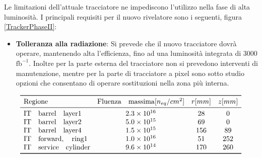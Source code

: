 Le limitazioni dell'attuale tracciatore ne impediscono l'utilizzo nella fase di alta luminosità. I principali requisiti per il nuovo rivelatore sono i seguenti, figura \ref{TrackerPhaseII}:

\begin{itemize}
\item \textbf{Tolleranza alla radiazione}: Si prevede che il nuovo tracciatore dovrà operare, mantenendo alta l'efficienza, fino ad una luminosità integrata di 3000 $\mathrm{fb^{-1}}$. Inoltre per la parte esterna del tracciatore non si prevedono interventi di manutenzione, mentre per la parte di tracciatore a pixel sono sotto studio opzioni che consentano di operare sostituzioni nella zona più interna. 
\end{itemize}

\[
\begin{array}{lccc}

\toprule
\mathrm{Regione} & \mathrm{Fluenza \quad massima} [n_{eq}/cm^2] & r [mm] & z[mm]  \\

\midrule

\mathrm{IT \quad barrel \quad layer 1} & 2.3\times10^{16} & 28 & 0\\

\mathrm{IT\quad barrel\quad layer 2} & 5.0\times10^{15} & 69 & 0\\

\mathrm{IT\quad barrel\quad layer 4} & 1.5\times10^{15} & 156 & 89\\

\mathrm{IT\quad forward,\quad ring 1} & 1.0\times10^{16} & 51 & 252\\

\mathrm{IT\quad service\quad cylinder} & 9.6\times10^{14} & 170 & 260\\

\bottomrule
\end{array}
\]

